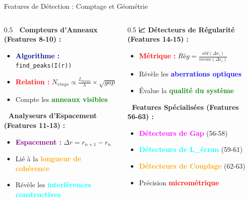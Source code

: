 \documentclass[aspectratio=169]{beamer}
\begin{document}
\begin{frame}{Features de Détection : Comptage et Géométrie}
    \begin{columns}
        \begin{column}{0.5\textwidth}
            \textbf{🔢 Compteurs d'Anneaux (Features 8-10) :}
            \begin{itemize}
                \item \textcolor{darkblue}{\textbf{Algorithme :}} \texttt{find\_peaks(I(r))}
                \item \textcolor{red}{\textbf{Relation :}} $N_{rings} \propto \frac{L_{écran}}{\lambda} \times \sqrt{gap}$
                \item Compte les \textcolor{green}{\textbf{anneaux visibles}}
            \end{itemize}

            \vspace{0.3cm}
            \textbf{📐 Analyseurs d'Espacement (Features 11-13) :}
            \begin{itemize}
                \item \textcolor{purple}{\textbf{Espacement :}} $\Delta r = r_{n+1} - r_n$
                \item Lié à la \textcolor{orange}{\textbf{longueur de cohérence}}
                \item Révèle les \textcolor{cyan}{\textbf{interférences constructives}}
            \end{itemize}
        \end{column}
        \begin{column}{0.5\textwidth}
            \textbf{📈 Détecteurs de Régularité (Features 14-15) :}
            \begin{itemize}
                \item \textcolor{red}{\textbf{Métrique :}} $Rég = \frac{std(\Delta r_i)}{mean(\Delta r_i)}$
                \item Révèle les \textcolor{blue}{\textbf{aberrations optiques}}
                \item Évalue la \textcolor{green}{\textbf{qualité du système}}
            \end{itemize}

            \vspace{0.3cm}
            \textbf{🎯 Features Spécialisées (Features 56-63) :}
            \begin{itemize}
                \item \textcolor{magenta}{\textbf{Détecteurs de Gap}} (56-58)
                \item \textcolor{cyan}{\textbf{Détecteurs de L\_écran}} (59-61)
                \item \textcolor{orange}{\textbf{Détecteurs de Couplage}} (62-63)
                \item Précision \textcolor{red}{\textbf{micrométrique}}
            \end{itemize}
        \end{column}
    \end{columns}
\end{frame}
\end{document}
